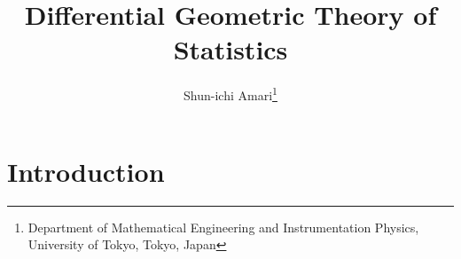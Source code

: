 \documentclass[11pt]{article}
\begin{document}
\newcommand{\tr}{\text{tr}}
\newcommand{\E}{\textbf{E}}
\newcommand{\diag}{\text{diag}}
\newcommand{\argmax}{\text{argmax}}
\newcommand{\argmin}{\text{argmin}}
\newcommand{\Cov}{\text{Cov}}
\newcommand{\Vol}{\text{Vol}}
\pagestyle{fancy}

\title{Differential Geometric Theory of Statistics}

\author{Shun-ichi Amari\thanks{
Department of Mathematical Engineering and Instrumentation Physics, University of Tokyo, Tokyo, Japan}}

\maketitle

\tableofcontents

\section{Introduction}
\end{document}
